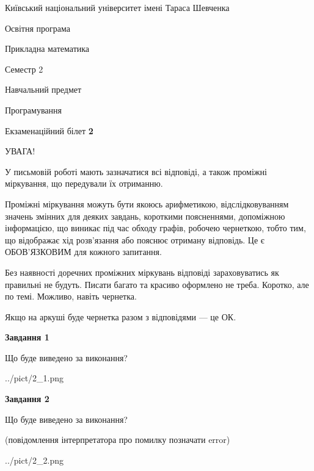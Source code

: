 \documentclass[12pt, ukrainian]{article}
\begin{document}
{{\begin {small}\par
{ \center  Київський національний університет імені Тараса Шевченка \par}
{\parbox {5 cm}{Освітня програма \hfill}{\parbox {7 cm}{Прикладна математика\hfill}}\parbox {6 cm}{\hfill Семестр 2}}\par
{\parbox {5 cm} {Навчальний предмет \hfill}\parbox {7 cm}{Програмування \hfill}\parbox {6cm}{\hfill}\par}\vspace{-7pt} \end{small}}{\center Екзаменаційний білет \No \textbf
{ 2 }\par}}
{
\begin {large}
УВАГА!

У письмовій роботі мають зазначатися всі відповіді, а також проміжні міркування, що передували їх отриманню.

Проміжні міркування можуть бути якоюсь арифметикою, відслідковуванням зна\-чень змінних для деяких завдань,
короткими поясненнями, допоміжною інформацією, що виникає під час обходу графів, робочею чернеткою,
тобто тим, що відображає хід розв’язання або пояснює отриману відповідь.
Це є ОБОВ’ЯЗКОВИМ для кожного запитання.

Без наявності доречних проміжних міркувань відповіді зараховуватись як правиль\-ні не будуть.
Писати багато та красиво оформлено не треба. Коротко, але по темі. Можли\-во, навіть чернетка.

Якщо на аркуші буде чернетка разом з відповідями --- це ОК.

\newpage

{\begin {center}\textbf{Завдання 1}\end {center}}\par
Що буде виведено за виконання?\par
\begin{center}
	{../pict/2_1.png}
\end{center}
\newpage

{\begin {center}\textbf{Завдання 2}\end {center}}\par
Що буде виведено за виконання?\par
 (повідомлення інтерпретатора про помилку позначати error)\par
\begin{center}
	{../pict/2_2.png}
\end{center}
\newpage


\end{large}}
\end{document}

